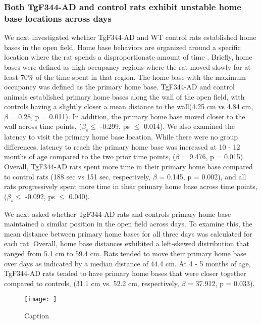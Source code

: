 \documentclass[fleqn,10pt]{wlscirep}
\begin{document}
\subsubsection*{Both TgF344-AD and control rats exhibit unstable home base locations across days}
We next investigated whether TgF344-AD and WT control rats established home bases in the open field. Home base behaviors are organized around a specific location where the rat spends a disproportionate amount of time \cite{tchernichovski_part_nodate}. Briefly, home bases were defined as high occupancy regions where the rat moved slowly for at least 70$\%$ of the time spent in that region. The home base with the maximum occupancy was defined as the primary home base. TgF344-AD and control animals established primary home bases along the wall of the open field, with controls having a slightly closer a mean distance to the wall(4.25 cm vs 4.84 cm, $\beta$ = 0.28, p = 0.011). In addition, the primary home base moved closer to the wall across time points, ($\beta_s \leq$ -0.299, ps $\leq$ 0.014). We also examined the latency to visit the primary home base location. While there were no group differences, latency to reach the primary home base was increased at 10 - 12 months of age compared to the two prior time points, ($\beta$ = 9.476, p = 0.015). Overall, TgF344-AD rats spent more time in their primary home base compared to control rats (188 sec vs 151 sec, respectively, $\beta$ = 0.145, p = 0.002), and all rats progressively spent more time in their primary home base across time points, ($\beta_s \leq$ -0.092, ps $\leq$ 0.040). 

We next asked whether TgF344-AD rats and controls primary home base maintained a similar position in the open field across days. To examine this, the mean distance between primary home bases for all three days was calculated for each rat. Overall, home base distances exhibited a left-skewed distribution that ranged from 5.1 cm to 59.4 cm. Rats tended to move their primary home base over days as indicated by a median distance of 44.4 cm. At 4 - 5 months of age, TgF344-AD rats tended to have primary home bases that were closer together compared to controls, (31.1 cm vs. 52.2 cm, respectively, $\beta$ = 37.912, p = 0.033). 

\begin{figure}
    \centering
    \texttt{[image: ]}
    \caption{Caption}
    \label{locomotor_fig}
\end{figure}
\end{document}
